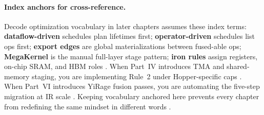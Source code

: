 \paragraph{Index anchors for cross-reference.}
Decode optimization vocabulary in later chapters assumes these index terms: \textbf{dataflow-driven} schedules plan lifetimes first; \textbf{operator-driven} schedules list ops first; \textbf{export edges} are global materializations between fused-able ops; \textbf{MegaKernel} is the manual full-layer stage pattern; \textbf{iron rules} assign registers, on-chip SRAM, and HBM roles \citep{yirage2026,dlbook}.
When Part~IV introduces TMA and shared-memory staging, you are implementing Rule~2 under Hopper-specific caps \citep{nvidia2022hopper}.
When Part~VI introduces YiRage fusion passes, you are automating the five-step migration at IR scale \citep{chen2020compilerbasedhardw}.
Keeping vocabulary anchored here prevents every chapter from redefining the same mindset in different words \citep{patel2025llminference}.

